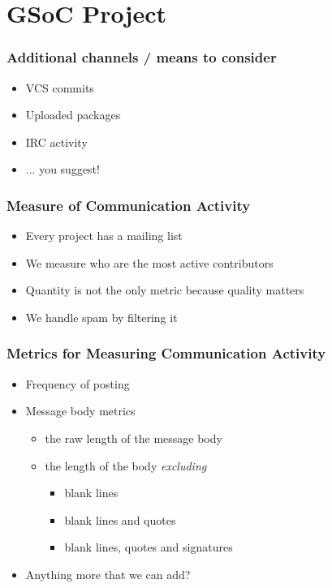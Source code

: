 \documentclass[compress]{beamer}
\begin{document}
\section{GSoC Project}

\begin{frame}
  \frametitle{Additional channels / means %
              to consider
             }
  \begin{itemize}
    \item VCS commits
    \item Uploaded packages
    \item IRC activity %
    \item ... you suggest!
  \end{itemize}
\end{frame}

\begin{frame}
  \frametitle{Measure of Communication Activity}

  \begin{itemize}
     \item Every project has a mailing list
     \item We measure who are the most active contributors
     \item Quantity is not the only metric because quality matters 
     \item We handle spam by filtering it
  \end{itemize}

\end{frame}

\begin{frame}
 \frametitle{Metrics for Measuring Communication Activity}

 \begin{itemize}
    \item Frequency of posting 
    \pause
    \item Message body metrics 
    \begin{itemize}
        \item the raw length of the message body
        \pause
        \item the length of the body \textit{excluding}

        \begin{itemize}
            \item blank lines
            \pause
            \item blank lines and quotes
            \pause
            \item blank lines, quotes and signatures
            \pause
        \end{itemize}

    \end{itemize}

    \pause
    \item Anything more that we can add? 

 \end{itemize}
\end{frame}
\end{document}
